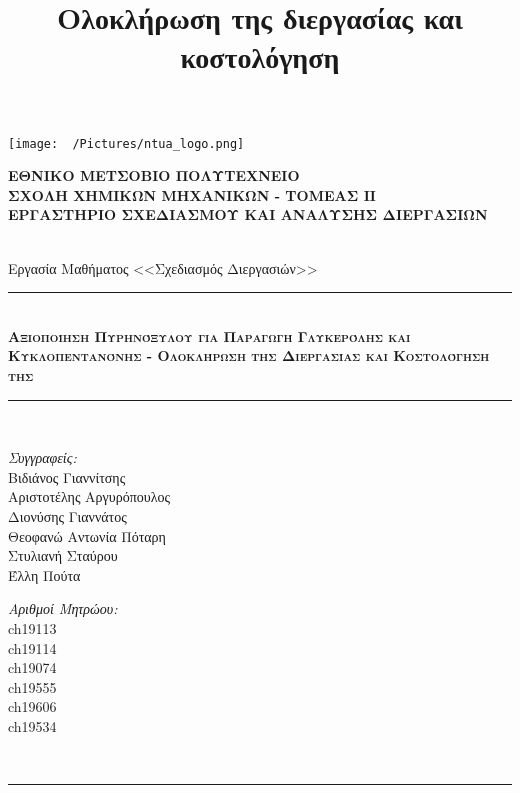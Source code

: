 \documentclass[11pt]{article}
\date{}
\title{Ολοκλήρωση της διεργασίας και κοστολόγηση}
\newcommand{\HRule}{\rule{\linewidth}{0.5mm}}
\begin{document}
\renewcommand{\abstractname}{Περίληψη}
\renewcommand{\tablename}{Πίνακας}
\renewcommand{\figurename}{Σχήμα}
\renewcommand\listingscaption{Κώδικας}

\renewcommand{\contentsname}{Περιεχόμενα}
\begin{titlepage}

\begin{center}
  \begin{minipage}{0.15\textwidth}
    \begin{flushleft}
      \texttt{[image: ~/Pictures/ntua\_logo.png]}\\[0.4cm]    
    \end{flushleft}
  \end{minipage}
  \begin{minipage}{0.80\textwidth}
    \textsc{\bfseries \large ΕΘΝΙΚΟ ΜΕΤΣΟΒΙΟ ΠΟΛΥΤΕΧΝΕΙΟ}\\[0.2cm]
    \textsc{\bfseries \large ΣΧΟΛΗ ΧΗΜΙΚΩΝ ΜΗΧΑΝΙΚΩΝ - ΤΟΜΕΑΣ ΙΙ}\\[0.2cm]
    \textsc{\bfseries \normalsize ΕΡΓΑΣΤΗΡΙΟ ΣΧΕΔΙΑΣΜΟΥ ΚΑΙ ΑΝΑΛΥΣΗΣ ΔΙΕΡΓΑΣΙΩΝ}\\[0.2cm]
  \end{minipage}
  \\[1.5cm]

  \Large Εργασία Μαθήματος <<Σχεδιασμός Διεργασιών>>\\[1.5cm]
  \HRule \\[0.4cm]
  { \textsc{\huge \bfseries Αξιοποίηση Πυρηνόξυλου για Παραγωγή Γλυκερόλης και Κυκλοπεντανόνης - Ολοκλήρωση της Διεργασίας και Κοστολόγηση της}}\\[0.4cm]
  \HRule \\[3cm]

  \begin{minipage}{0.4\textwidth}
    \begin{flushleft} \large
      \emph{Συγγραφείς:}\\
      Βιδιάνος Γιαννίτσης\\
      Αριστοτέλης Αργυρόπουλος\\
      Διονύσης Γιαννάτος\\
      Θεοφανώ Αντωνία Πόταρη\\
      Στυλιανή Σταύρου\\
      Έλλη Πούτα
    \end{flushleft}
  \end{minipage}
  \begin{minipage}{0.4\textwidth}
    \begin{flushright} \large
      \emph{Αριθμοί Μητρώου:}\\
      ch19113\\
      ch19114\\
      ch19074\\
      ch19555\\
      ch19606\\
      ch19534
    \end{flushright}
  \end{minipage}\\[1cm]
  \HRule \\[2cm]


\end{center}
\end{titlepage}
\end{document}
